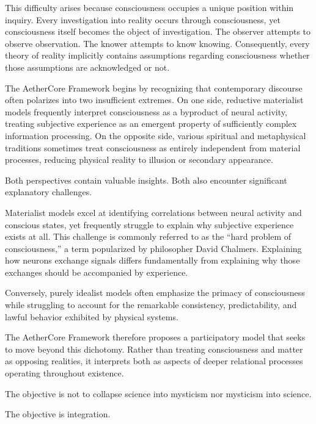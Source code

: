\documentclass[12pt]{article}
\begin{document}
This difficulty arises because consciousness occupies a unique position within inquiry. Every investigation into reality occurs through consciousness, yet consciousness itself becomes the object of investigation. The observer attempts to observe observation. The knower attempts to know knowing. Consequently, every theory of reality implicitly contains assumptions regarding consciousness whether those assumptions are acknowledged or not.

The AetherCore Framework begins by recognizing that contemporary discourse often polarizes into two insufficient extremes. On one side, reductive materialist models frequently interpret consciousness as a byproduct of neural activity, treating subjective experience as an emergent property of sufficiently complex information processing. On the opposite side, various spiritual and metaphysical traditions sometimes treat consciousness as entirely independent from material processes, reducing physical reality to illusion or secondary appearance.

Both perspectives contain valuable insights. Both also encounter significant explanatory challenges.

Materialist models excel at identifying correlations between neural activity and conscious states, yet frequently struggle to explain why subjective experience exists at all. This challenge is commonly referred to as the ``hard problem of consciousness,'' a term popularized by philosopher David Chalmers. Explaining how neurons exchange signals differs fundamentally from explaining why those exchanges should be accompanied by experience.

Conversely, purely idealist models often emphasize the primacy of consciousness while struggling to account for the remarkable consistency, predictability, and lawful behavior exhibited by physical systems.

The AetherCore Framework therefore proposes a participatory model that seeks to move beyond this dichotomy. Rather than treating consciousness and matter as opposing realities, it interprets both as aspects of deeper relational processes operating throughout existence.

The objective is not to collapse science into mysticism nor mysticism into science.

The objective is integration.

\end{document}
